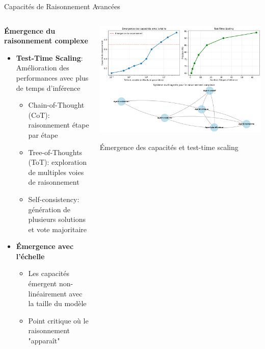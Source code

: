 \documentclass[aspectratio=169,11pt]{beamer}
\begin{document}
\begin{frame}{Capacités de Raisonnement Avancées}
    \begin{columns}
        \begin{column}{0.55\textwidth}
            \textbf{Émergence du raisonnement complexe}
            \begin{itemize}
                \item \textbf{Test-Time Scaling}: Amélioration des performances avec plus de temps d'inférence
                \begin{itemize}
                    \item Chain-of-Thought (CoT): raisonnement étape par étape
                    \item Tree-of-Thoughts (ToT): exploration de multiples voies de raisonnement
                    \item Self-consistency: génération de plusieurs solutions et vote majoritaire
                \end{itemize}
                \vspace{0.3cm}
                \item \textbf{Émergence avec l'échelle}
                \begin{itemize}
                    \item Les capacités émergent non-linéairement avec la taille du modèle
                    \item Point critique où le raisonnement "apparaît"
                \end{itemize}
            \end{itemize}
        \end{column}
        \begin{column}{0.45\textwidth}
            \includegraphics[width=\textwidth]{images/generated/llm_future.png}
            \vspace{0.2cm}
            \begin{center}
                \small{Émergence des capacités et test-time scaling}
            \end{center}
        \end{column}
    \end{columns}
\end{frame}
\end{document}
